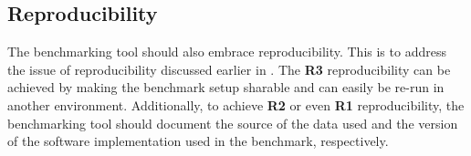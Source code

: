 \subsection{Reproducibility}
The benchmarking tool should also embrace reproducibility.
This is to address the issue of reproducibility discussed earlier in .
The \textbf{R3} reproducibility can be achieved by making the benchmark setup sharable and can easily be re-run in another environment.
Additionally, to achieve \textbf{R2} or even \textbf{R1} reproducibility, the benchmarking tool should document the source of the data used and the version of the software implementation used in the benchmark, respectively.
